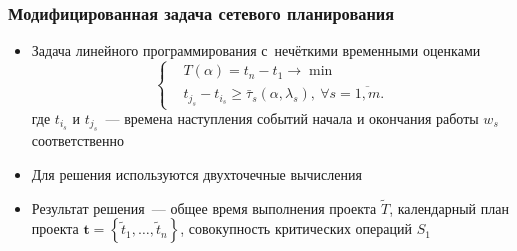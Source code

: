 \documentclass[12pt]{beamer}
\begin{document}
\begin{frame}
  \frametitle{Модифицированная задача сетевого планирования}
  \begin{itemize}
    \item Задача линейного программирования с~нечёткими временными оценками
      \begin{equation}
      \label{eq:modified-fcpm-lp}
        \left\{ \begin{aligned}
          & T(\alpha )=t_n-t_1\to \min  \\ 
          & t_{j_s}-t_{i_s}\geqslant \bar{\tau}_s\left(\alpha,\lambda_s \right),\ \forall s=\overline{1,m}.
        \end{aligned} \right.
      \end{equation}
      где $t_{i_s}$ и $t_{j_s}$~--- времена наступления событий начала и окончания работы $w_s$ соответственно
    \item Для решения используются двухточечные вычисления
    \item Результат решения~--- общее время выполнения проекта $\tilde T$, календарный план проекта $\mathbf{t}=\left\{\tilde t_1, \ldots, \tilde t_n \right\}$, совокупность критических операций $S_1$
  \end{itemize}
  

\end{frame}
\end{document}
